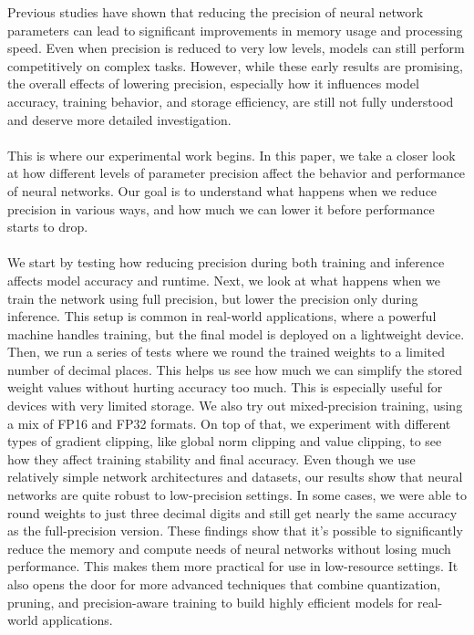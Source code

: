 \documentclass[11pt]{article}
\begin{document}
	Previous studies have shown that reducing the precision of neural network parameters can lead to significant improvements in memory usage and processing speed. Even when precision is reduced to very low levels, models can still perform competitively on complex tasks. However, while these early results are promising, the overall effects of lowering precision, especially how it influences model accuracy, training behavior, and storage efficiency, are still not fully understood and deserve more detailed investigation. \\ \\
	This is where our experimental work begins. 
	In this paper, we take a closer look at how different levels of parameter precision affect the behavior and performance of neural networks. Our goal is to understand what happens when we reduce precision in various ways, and how much we can lower it before performance starts to drop. \\ \\
	We start by testing how reducing precision during both training and inference affects model accuracy and runtime. Next, we look at what happens when we train the network using full precision, but lower the precision only during inference. This setup is common in real-world applications, where a powerful machine handles training, but the final model is deployed on a lightweight device. 
	Then, we run a series of tests where we round the trained weights to a limited number of decimal places. This helps us see how much we can simplify the stored weight values without hurting accuracy too much. This is especially useful for devices with very limited storage. 
	We also try out mixed-precision training, using a mix of FP16 and FP32 formats. On top of that, we experiment with different types of gradient clipping, like global norm clipping and value clipping, to see how they affect training stability and final accuracy. 
	Even though we use relatively simple network architectures and datasets, our results show that neural networks are quite robust to low-precision settings. In some cases, we were able to round weights to just three decimal digits and still get nearly the same accuracy as the full-precision version. 
	These findings show that it’s possible to significantly reduce the memory and compute needs of neural networks without losing much performance. This makes them more practical for use in low-resource settings. It also opens the door for more advanced techniques that combine quantization, pruning, and precision-aware training to build highly efficient models for real-world applications. 
	
	
	
	
	
	
	
\end{document}
